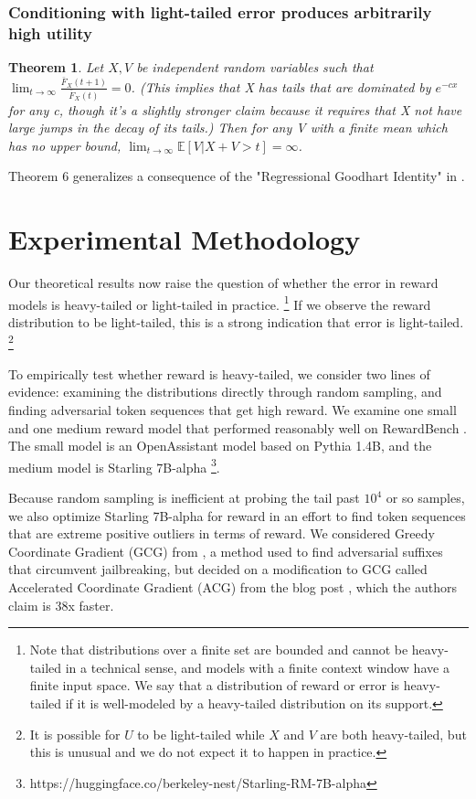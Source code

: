 \documentclass{article}
\newtheorem{theorem}{Theorem}
\begin{document}
\subsubsection{Conditioning with light-tailed error produces arbitrarily high utility}
\begin{theorem}
    \label{thm6}
    Let $X, V$ be independent random variables such that $\lim_{t\to\infty}\frac{\bar{F}_X(t+1)}{\bar{F}_X(t)}=0$. (This implies that X has tails that are dominated by $e^{-cx}$ for any c, though it's a slightly stronger claim because it requires that X not have large jumps in the decay of its tails.)
    Then for any V with a finite mean which has no upper bound, $\lim_{t\to\infty}\mathbb{E}[V|X+V > t] = \infty$. 
\end{theorem}

Theorem 6 generalizes a consequence of the "Regressional Goodhart Identity" in \citep{gao2023scaling}.

\section{Experimental Methodology}

Our theoretical results now raise the question of whether the error in reward models is heavy-tailed or light-tailed in practice. \footnote{Note that distributions over a finite set are bounded and cannot be heavy-tailed in a technical sense, and models with a finite context window have a finite input space. We say that a distribution of reward or error is heavy-tailed if it is well-modeled by a heavy-tailed distribution on its support.} If we observe the reward distribution to be light-tailed, this is a strong indication that error is light-tailed. \footnote{It is possible for $U$ to be light-tailed while $X$ and $V$ are both heavy-tailed, but this is unusual and we do not expect it to happen in practice.}

To empirically test whether reward is heavy-tailed, we consider two lines of evidence: examining the distributions directly through random sampling, and finding adversarial token sequences that get high reward. We examine one small and one medium reward model that performed reasonably well on RewardBench \citep{lambert2023rewardbench}. The small model is an OpenAssistant model based on Pythia 1.4B, and the medium model is Starling 7B-alpha \citep{starling2023}\footnote{https://huggingface.co/berkeley-nest/Starling-RM-7B-alpha}.

Because random sampling is inefficient at probing the tail past $10^4$ or so samples, we also optimize Starling 7B-alpha for reward in an effort to find token sequences that are extreme positive outliers in terms of reward. We considered Greedy Coordinate Gradient (GCG) from \citep{zou2023universal}, a method used to find adversarial suffixes that circumvent jailbreaking, but decided on a modification to GCG called Accelerated Coordinate Gradient (ACG) from the blog post \citep{haizelabs2024acg}, which the authors claim is 38x faster.
\end{document}
